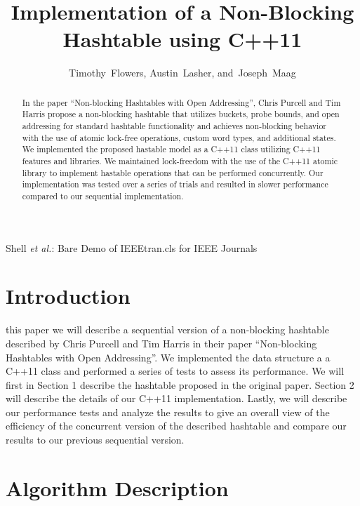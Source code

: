 \documentclass[journal]{IEEEtran}
\begin{document}
\title{Implementation of a Non-Blocking\\ Hashtable using C++11}
\author{Timothy~Flowers,
        Austin~Lasher,
        and~Joseph~Maag%
}

{Shell \MakeLowercase{\textit{et al.}}: Bare Demo of IEEEtran.cls for IEEE Journals}
\maketitle

\begin{abstract}
In the paper “Non-blocking Hashtables with Open Addressing”, Chris Purcell and Tim Harris propose a non-blocking hashtable that utilizes buckets, probe bounds, and open addressing for standard hashtable functionality and achieves non-blocking behavior with the use of atomic lock-free operations, custom word types, and additional states. We implemented the proposed hastable model as a C++11 class utilizing C++11 features and libraries. We maintained lock-freedom with the use of the C++11 atomic library to implement hastable operations that can be performed concurrently. Our implementation was tested over a series of trials and resulted in slower performance compared to our sequential implementation. 
\end{abstract}

\section{Introduction}
 this paper we will describe a  sequential version of a non-blocking hashtable described by Chris Purcell and Tim Harris in their paper “Non-blocking Hashtables with Open Addressing”. We implemented the data structure a a C++11 class and performed a series of tests to assess its performance.
We will first in Section 1 describe the hashtable proposed in the original paper. Section 2 will describe the details of our C++11 implementation. Lastly, we will describe our performance tests and analyze the results to give an overall view of the efficiency of the concurrent version of the described hashtable and compare our results to our previous sequential version.


 
\section{Algorithm Description}
\end{document}

